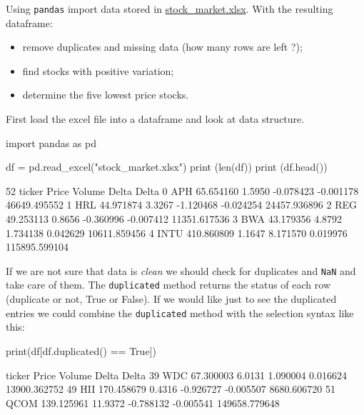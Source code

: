 \begin{question}
Using \texttt{pandas} import data stored in \href{https://github.com/matteosan1/finance_course/raw/master/input_files/stock_market.xlsx}{stock\_market.xlsx}. With the resulting dataframe:
\begin{itemize}
\tightlist
\item remove duplicates and missing data (how many rows are left ?);
\item find stocks with positive variation;
\item determine the five lowest price stocks.
\end{itemize}
\end{question}

\cprotEnv\begin{solution}
First load the excel file into a dataframe and look at data structure.

\begin{ipython}
import pandas as pd

df = pd.read_excel("stock_market.xlsx")
print (len(df))
print (df.head())
\end{ipython}
\begin{ioutput}
52
  ticker       Price  Volume     Delta    Delta%
0    APH   65.654160  1.5950 -0.078423 -0.001178   46649.495552
1    HRL   44.971874  3.3267 -1.120468 -0.024254   24457.936896
2    REG   49.253113  0.8656 -0.360996 -0.007412   11351.617536
3    BWA   43.179356  4.8792  1.734138  0.042629   10611.859456
4   INTU  410.860809  1.1647  8.171570  0.019976  115895.599104
\end{ioutput}
        
If we are not sure that data is \emph{clean} we should check for duplicates and \texttt{NaN} and take care of them. The \texttt{duplicated} method returns the status of each row (duplicate or not, True or False). If we would like just to see the duplicated entries we could combine the \texttt{duplicated} method with the selection syntax like this:

\begin{ipython}
print(df[df.duplicated() == True])
\end{ipython}
\begin{ioutput}
   ticker       Price   Volume     Delta    Delta%
39    WDC   67.300003   6.0131  1.090004  0.016624   13900.362752
49    HII  170.458679   0.4316 -0.926727 -0.005507    8680.606720
51   QCOM  139.125961  11.9372 -0.788132 -0.005541  149658.779648
\end{ioutput}
        

\end{solution}
